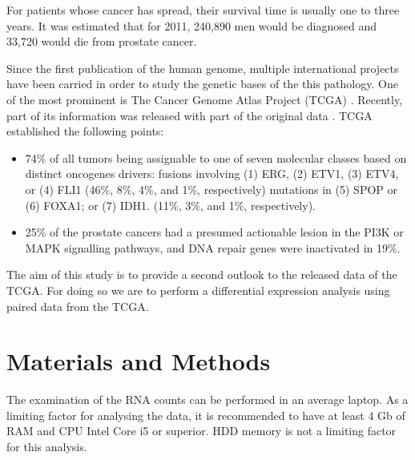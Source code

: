 \documentclass[9pt,twocolumn,twoside]{gsajnl}
\begin{document}
For patients whose cancer has spread, their survival time is usually one to three years. It was estimated that for 2011, 240,890 men would be diagnosed and 33,720 would die from prostate cancer.


Since the first publication of the human genome, multiple international projects have been carried in order to study the genetic bases of the this pathology. One of the most prominent is The Cancer Genome Atlas Project (TCGA) \cite{tgca}. Recently, part of its information was released with part of the original data \cite{Rahman15112015}. TCGA established the following points:

\begin{itemize}
\item 74\% of all tumors being assignable to one of seven molecular classes based on distinct oncogenes drivers:
        fusions involving (1) ERG, (2) ETV1, (3) ETV4, or (4) FLI1 (46\%, 8\%, 4\%, and 1\%, respectively)
        mutations in (5) SPOP or (6) FOXA1; or (7) IDH1. (11\%, 3\%, and 1\%, respectively).
\item 25\% of the prostate cancers had a presumed actionable lesion in the PI3K or MAPK signalling pathways, and DNA repair genes were inactivated in 19\%.
\end{itemize}


The aim of this study is to provide a second outlook to the released data of the TCGA. For doing so we are to perform a differential expression analysis using paired data from the TCGA.

\section*{Materials and Methods}



The examination of the RNA counts can be performed in an average laptop. As a limiting factor for analysing the data, it is recommended to have at least 4 Gb of RAM and CPU Intel Core i5 or superior. HDD memory is not a limiting factor for this analysis.
\end{document}
